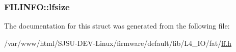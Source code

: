 \subsubsection[{\texorpdfstring{lfsize}{lfsize}}]{ F\+I\+L\+I\+N\+F\+O\+::lfsize}\hypertarget{structFILINFO_a2527c511ff4d12d285dbf3c4b3c9fb7b}{}\label{structFILINFO_a2527c511ff4d12d285dbf3c4b3c9fb7b}


The documentation for this struct was generated from the following file\+:\begin{DoxyCompactItemize}
\item 
/var/www/html/\+S\+J\+S\+U-\/\+D\+E\+V-\/\+Linux/firmware/default/lib/\+L4\+\_\+\+I\+O/fat/\hyperlink{ff_8h}{ff.\+h}\end{DoxyCompactItemize}

